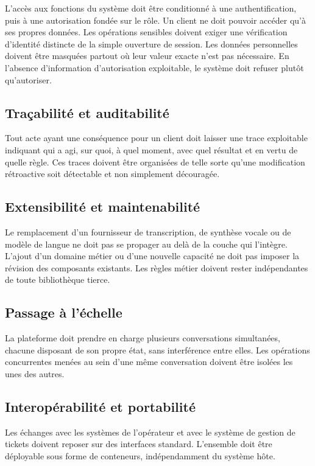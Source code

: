 L'accès aux fonctions du système doit être conditionné à une authentification, puis à une autorisation fondée sur le rôle. Un client ne doit pouvoir accéder qu'à ses propres données. Les opérations sensibles doivent exiger une vérification d'identité distincte de la simple ouverture de session. Les données personnelles doivent être masquées partout où leur valeur exacte n'est pas nécessaire. En l'absence d'information d'autorisation exploitable, le système doit refuser plutôt qu'autoriser.

\subsection{Traçabilité et auditabilité}

Tout acte ayant une conséquence pour un client doit laisser une trace exploitable indiquant qui a agi, sur quoi, à quel moment, avec quel résultat et en vertu de quelle règle. Ces traces doivent être organisées de telle sorte qu'une modification rétroactive soit détectable et non simplement découragée.

\subsection{Extensibilité et maintenabilité}

Le remplacement d'un fournisseur de transcription, de synthèse vocale ou de modèle de langue ne doit pas se propager au delà de la couche qui l'intègre. L'ajout d'un domaine métier ou d'une nouvelle capacité ne doit pas imposer la révision des composants existants. Les règles métier doivent rester indépendantes de toute bibliothèque tierce.

\subsection{Passage à l'échelle}

La plateforme doit prendre en charge plusieurs conversations simultanées, chacune disposant de son propre état, sans interférence entre elles. Les opérations concurrentes menées au sein d'une même conversation doivent être isolées les unes des autres.

\subsection{Interopérabilité et portabilité}

Les échanges avec les systèmes de l'opérateur et avec le système de gestion de tickets doivent reposer sur des interfaces standard. L'ensemble doit être déployable sous forme de conteneurs, indépendamment du système hôte.

